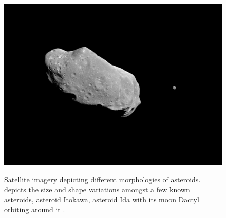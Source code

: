 \begin{figure}[htb]
\begin{minipage}{0.48\columnwidth}
{            \includegraphics[width=\columnwidth, height=0.25\textheight, keepaspectratio=true]{Ida_Dactyl.jpg}
            \label{fig:ida_dactyl_image}
        }
    \end{minipage}
\caption{Satellite imagery depicting different morphologies of asteroids. \protect{} depicts the size and shape variations amongst a few known asteroids, \protect{} asteroid Itokawa, \protect{} asteroid Ida with its moon Dactyl orbiting around it \parencite{nasa_asteroids_web}.}
\label{fig:asteroid_shapes}
\end{figure}
\FloatBarrier
